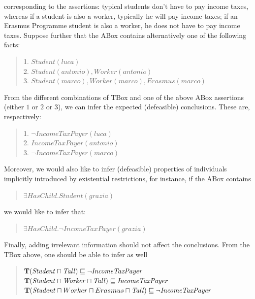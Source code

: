 \documentclass[a4paper, 11pt, oneside]{duthesis}
\newcommand{\tip}{{\bf T}}
\newcommand{\sqset}{\sqsubseteq}
\newcommand{\mint}{\sqcap}
\begin{document}
\noindent corresponding to the assertions: typical students don't have to pay income taxes, whereas if a student is also a worker, typically he will pay income taxes; if an Erasmus Programme student is also a worker, he does not have to pay income taxes.
Suppose  further that the ABox contains alternatively one of the following facts:

\begin{quote}
1. $\mathit{Student}(\mathit{luca})$ \\
2. $\mathit{Student}(\mathit{antonio}), \mathit{Worker}(\mathit{antonio})$ \\
3. $\mathit{Student}(\mathit{marco}), \mathit{Worker}(\mathit{marco}), Erasmus(\mathit{marco})$
\end{quote}


\noindent From the different combinations of TBox and one of the above ABox assertions (either $1$ or $2$ or $3$), we can infer the expected (defeasible) conclusions. These are, respectively:

\begin{quote}
1. $\mathit{\neg IncomeTaxPayer}(\mathit{luca})$\\
2. $\mathit{IncomeTaxPayer}(\mathit{antonio})$ \\
3. $\mathit{\neg IncomeTaxPayer}(\mathit{marco})$
\end{quote}

\noindent Moreover, we would also like to infer (defeasible) properties of individuals
implicitly introduced by existential restrictions, for instance,
if the ABox contains

\begin{quote}
$\exists \mathit{HasChild}.\mathit{Student(grazia)}$
\end{quote}

\noindent we would like to infer that:
\begin{quote}
$\exists \mathit{HasChild.\neg IncomeTaxPayer(grazia)}$
\end{quote}

\noindent Finally, adding irrelevant information should not affect the conclusions. From the TBox above, one should be able to infer as well

\begin{quote}
$\tip (\mathit{Student} \mint \mathit{Tall}) \sqset \mathit{\neg IncomeTaxPayer}$\\
$\tip (\mathit{Student} \mint \mathit{Worker} \mint \mathit{Tall})  \sqset \mathit{IncomeTaxPayer}$ \\
$\tip (\mathit{Student} \mint Worker \mint Erasmus \mint \mathit{Tall})  \sqset \mathit{\neg IncomeTaxPayer}$
\end{quote}
\end{document}
